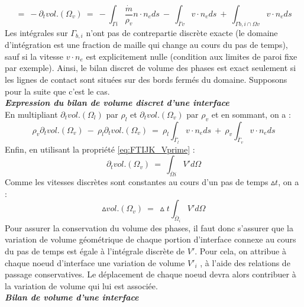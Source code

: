 \begin{equation}
=\:-\partial_{t}vol.(\Omega_{v})\:=\:-\int_{\Gamma i}\dfrac{\dot{m}}{\rho_{v}}n\cdot n_{e}ds\:-\:\int_{\overline{\Gamma}v}v \cdot n_{e} ds\:+\:\int_{\Gamma b,i \cap \Omega v} v \cdot n_{e} ds
\end{equation}
Les int\'egrales sur $\Gamma_{b,i}$ n’ont pas de contrepartie discrète exacte (le domaine d’int\'egration est une fraction de maille qui change au cours du pas de temps), sauf si la vitesse $v \cdot n_{e}$ est explicitement nulle (condition aux limites de paroi fixe par exemple). Ainsi, le bilan discret de volume des phases est exact seulement si les lignes de contact sont situ\'ees sur des bords ferm\'es du domaine. Supposons pour la suite que c’est le cas.\smallskip \\

\textit{\textbf{Expression du bilan de volume discret d’une interface}}\smallskip \\
En multipliant $\partial_{t}vol.(\Omega_{l})$ par $\rho_{l}$ et $\partial_{t}vol.(\Omega_{v})$ par $\rho_{v}$ et en sommant, on a :
\begin{equation}
\rho_{v}\partial_{t}vol.(\Omega_{v})\:-\:\rho_{l}\partial_{t}vol.(\Omega_{v})\:=\:\rho_{l}\int_{\overline{\Gamma}_{l}} v \cdot n_{e} ds\:+\:\rho_{v}\int_{\overline{\Gamma}_{v}} v \cdot n_{e} ds
\end{equation}
Enfin, en utilisant la propri\'et\'e \ref{eq:FTIJK_Vprime} :
\begin{equation}
\partial_{t}vol.(\Omega_{v})\:=\:\int_{\overline{\Omega} i} V' d\Omega
\end{equation}
Comme les vitesses discrètes sont constantes au cours d’un pas de temps $\vartriangle t$, on a :
\begin{equation}
\vartriangle vol.(\Omega_{v})\:=\:\vartriangle t \int_{\overline{\Omega}_{i}} V' d\Omega
\end{equation}
Pour assurer la conservation du volume des phases, il faut donc s’assurer que la variation de volume g\'eom\'etrique de chaque portion d’interface connexe au cours du pas de temps est \'egale à l’int\'egrale discrète de $V'$. Pour cela, on attribue \`a chaque noeud d’interface une variation de volume $V'_{i}$ , \`a l’aide des relations de passage conservatives. Le d\'eplacement de chaque noeud devra alors contribuer à la variation de volume qui lui est associ\'ee.\smallskip \\

\textit{\textbf{Bilan de volume d’une interface}}\smallskip \\

